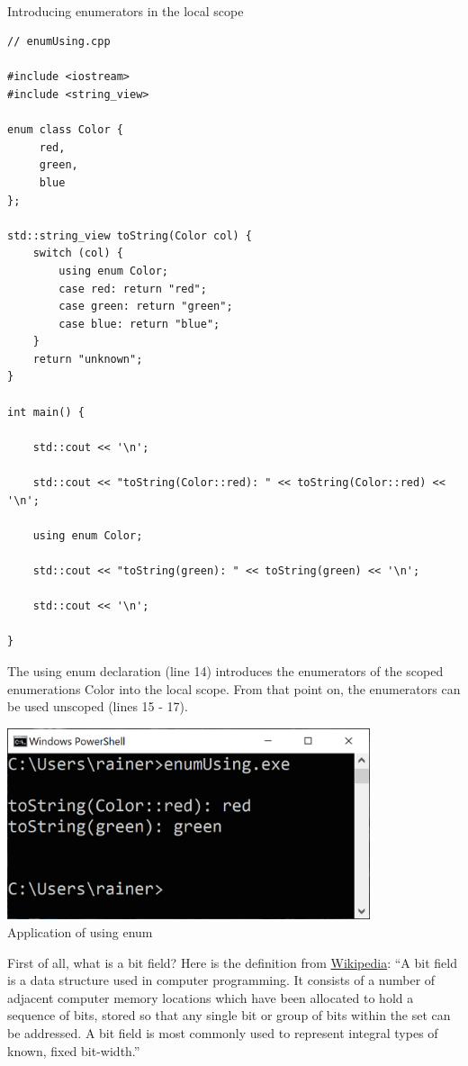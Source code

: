 \hspace*{\fill} \\ %
\noindent
Introducing enumerators in the local scope
\begin{lstlisting}[style=styleCXX]
// enumUsing.cpp

#include <iostream>
#include <string_view>

enum class Color {
	 red,
	 green,
	 blue
};

std::string_view toString(Color col) {
	switch (col) {
		using enum Color;
		case red: return "red";
		case green: return "green";
		case blue: return "blue";
	}
	return "unknown";
}

int main() {

	std::cout << '\n';
	
	std::cout << "toString(Color::red): " << toString(Color::red) << '\n';
	
	using enum Color;
	
	std::cout << "toString(green): " << toString(green) << '\n';
	
	std::cout << '\n';

}
\end{lstlisting}

The using enum declaration (line 14) introduces the enumerators of the scoped enumerations Color into the local scope. From that point on, the enumerators can be used unscoped (lines 15 - 17).

\begin{center}
\includegraphics[width=0.8\textwidth]{content/3/chapter4/images/48.png}\\
Application of using enum
\end{center}


First of all, what is a bit field? Here is the definition from \href{https://en.wikipedia.org/wiki/Bit_field}{Wikipedia}: “A bit field is a data structure used in computer programming. It consists of a number of adjacent computer memory locations which have been allocated to hold a sequence of bits, stored so that any single bit or group of bits within the set can be addressed. A bit field is most commonly used to represent integral types of known, fixed bit-width.”

